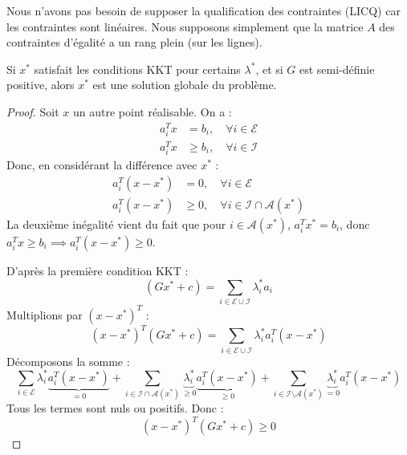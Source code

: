     \begin{remarque}
        Nous n'avons pas besoin de supposer la qualification des contraintes (LICQ) car les contraintes sont linéaires. Nous supposons simplement que la matrice $A$ des contraintes d'égalité a un rang plein (sur les lignes).
    \end{remarque}

    \begin{theoreme}
        Si $x^*$ satisfait les conditions KKT pour certains $\lambda^*$, et si $G$ est semi-définie positive, alors $x^*$ est une solution globale du problème.
    \end{theoreme}

    \begin{proof}
        Soit $x$ un autre point réalisable. On a :
        \begin{equation}
            \begin{aligned}
                a_i^T x &= b_i, \quad \forall i \in \mathcal{E} \\
                a_i^T x &\ge b_i, \quad \forall i \in \mathcal{I}
            \end{aligned}
        \end{equation}
        Donc, en considérant la différence avec $x^*$ :
        \begin{equation}
            \begin{aligned}
                a_i^T (x - x^*) &= 0, \quad \forall i \in \mathcal{E} \\
                a_i^T (x - x^*) &\ge 0, \quad \forall i \in \mathcal{I} \cap \mathcal{A}(x^*)
            \end{aligned}
        \end{equation}
        La deuxième inégalité vient du fait que pour $i \in \mathcal{A}(x^*)$, $a_i^T x^* = b_i$, donc $a_i^T x \ge b_i \implies a_i^T (x - x^*) \ge 0$.

        D'après la première condition KKT :
        \begin{equation}
            (G x^* + c) = \sum_{i \in \mathcal{E} \cup \mathcal{I}} \lambda_i^* a_i
        \end{equation}
        Multiplions par $(x - x^*)^T$ :
        \begin{equation}
            (x - x^*)^T (G x^* + c) = \sum_{i \in \mathcal{E} \cup \mathcal{I}} \lambda_i^* a_i^T (x - x^*)
        \end{equation}
        Décomposons la somme :
        \begin{equation}
            \sum_{i \in \mathcal{E}} \lambda_i^* \underbrace{a_i^T (x - x^*)}_{=0} + \sum_{i \in \mathcal{I} \cap \mathcal{A}(x^*)} \underbrace{\lambda_i^*}_{\ge 0} \underbrace{a_i^T (x - x^*)}_{\ge 0} + \sum_{i \in \mathcal{I} \setminus \mathcal{A}(x^*)} \underbrace{\lambda_i^*}_{=0} a_i^T (x - x^*)
        \end{equation}
        Tous les termes sont nuls ou positifs. Donc :
        \begin{equation}
            (x - x^*)^T (G x^* + c) \ge 0
        \end{equation}


\end{proof}

